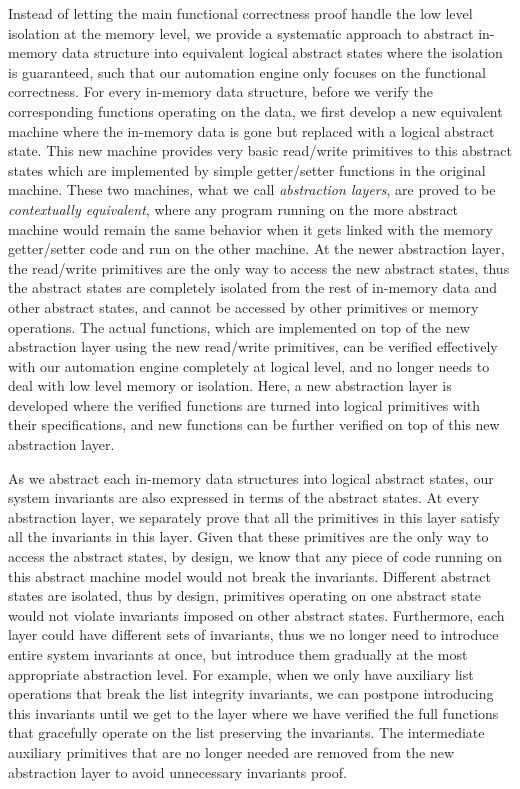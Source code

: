 Instead of letting the main functional correctness proof handle the low level
isolation at the memory level,  we provide a systematic approach to abstract in-memory
data structure into equivalent logical abstract states where the isolation is guaranteed,
such that our automation engine only focuses on the functional correctness.
For every in-memory data structure, before we verify the corresponding functions operating
on the data, we first develop a new equivalent machine where the in-memory data is gone but replaced
with a logical abstract state. This new machine provides very basic read/write primitives to this
abstract states which are implemented by simple getter/setter functions in the original machine.
These two machines, what we call {\it abstraction layers}, are proved to be {\it contextually equivalent},
where any program running on the more abstract machine would remain the same behavior when it gets
linked with the memory getter/setter code and  run on the other machine.
At the newer abstraction layer, the read/write primitives are the only way to access the new abstract
states, thus the abstract states are completely isolated from the rest of in-memory data and other
abstract states, and cannot be accessed by other primitives or memory operations.
The actual functions, which are implemented on top of the new abstraction layer
using the new read/write primitives, can be verified
effectively with our automation engine completely at logical level, and no longer needs to deal with
low level memory or isolation. Here, a new abstraction layer is developed where the verified
functions are turned into logical primitives with their specifications, and new functions can be
further verified on top of this new abstraction layer.

As we abstract each in-memory data structures into logical abstract states, our system invariants
are also expressed in terms of the abstract states. At every abstraction layer, we separately
prove that all the primitives in this layer satisfy all the invariants in this layer. Given that these
primitives are the only way to access the abstract states, by design, we know that any piece of
code running on this abstract machine model would not break the invariants. 
Different abstract states are isolated, thus by design, primitives operating on one abstract
state would not violate invariants imposed on other abstract states.
Furthermore, each
layer could have different sets of invariants, thus we no longer need to introduce entire system
invariants at once, but introduce them gradually at the most appropriate abstraction level.
For example, when we only have auxiliary list operations that break the list integrity invariants,
we can postpone introducing this invariants until we get to the layer where we have
verified the full functions that gracefully operate on the list preserving the invariants.
The intermediate auxiliary primitives that are no longer needed are removed from the new abstraction
layer to avoid unnecessary invariants proof.


